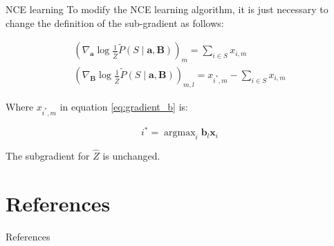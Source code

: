 \documentclass{beamer}
\DeclareMathOperator*{\argmax}{argmax}
\begin{document}
  \begin{frame}{NCE learning}
    To modify the NCE learning algorithm, it is just necessary to change the definition of the sub-gradient as follows:
    
    \begin{eqnarray}
      \left(\nabla_{\bm{a}} \log{\frac{1}{\hat{Z}} \tilde{P}\left(S \mid \bm{a},\bm{B} \right)}\right)_{m} = \sum_{i \in S}{x_{i,m}} \\
      \left(\nabla_{\bm{B}} \log{\frac{1}{\hat{Z}} \tilde{P}\left(S \mid \bm{a},\bm{B} \right)}\right)_{m, l} = x_{i^{*},m} - \sum_{i \in S}{x_{i,m}} \label{eq:gradient_b}
    \end{eqnarray}
    
    Where $x_{i^{*},m}$ in equation \ref{eq:gradient_b} is:
    
    \begin{equation*}
      i^{*} = \argmax_{i} \bm{b}_{l} \bm{x}_{i}
    \end{equation*} 
    
    The subgradient for $\hat{Z}$ is unchanged.
    
  \end{frame}
  
  
  \section*{References}
  \begin{frame}{References}
    {}
  \end{frame}
\end{document}
